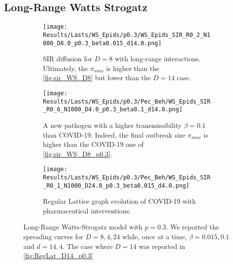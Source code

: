 \documentclass[a4paper,10pt]{book} %
\theoremstyle{definition}
\begin{document}
\clearpage
\subsection{Long-Range Watts Strogatz}
\begin{figure}[htbp]
    \centering
	\begin{subfigure}[t]{\textwidth}
        \centering
        \texttt{[image: Results/Lasts/WS\_Epids/p0.3/WS\_Epids\_SIR\_R0\_2\_N1000\_D8.0\_p0.3\_beta0.015\_d14.0.png]} 
        \caption{SIR diffusion for $ D = 8$ with long-range interactions. Ultimately, the $ \pi_{max} $ is higher than the \autoref{fig:sir_WS_D8} but lower than the $ D = 14$ case.} 
		\label{fig:sir_WS_D8_p0.3}
    \end{subfigure}
	\vfill
	\begin{subfigure}[t]{\textwidth}
        \centering
        \texttt{[image: Results/Lasts/WS\_Epids/p0.3/Pec\_Beh/WS\_Epids\_SIR\_R0\_6\_N1000\_D4.0\_p0.3\_beta0.1\_d14.0.png]}
        \caption{A new pathogen with a higher transmissibility $ \beta = 0.1$ than COVID-19. Indeed, the final outbreak size $\pi_{max} $ is higher than the COVID-19 one of \autoref{fig:sir_WS_D8_p0.3}.} 
		\label{fig:sir_WS_D4_b0.1_p0.3}
    \end{subfigure}
	\vfill
    \begin{subfigure}[t]{\textwidth}
        \centering
        \texttt{[image: Results/Lasts/WS\_Epids/p0.3/Pec\_Beh/WS\_Epids\_SIR\_R0\_1\_N1000\_D24.0\_p0.3\_beta0.015\_d4.0.png]} 
        \caption{Regular Lattice graph evolution of COVID-19 with pharmaceutical interventions.} 
		\label{fig:sir_WS_D24_d4_p0.3}
    \end{subfigure}
    \caption{Long-Range Watts-Strogatz model with $ p = 0.3$. We reported the spreading curves for $D = 8, 4, 24$ while, once at a time, $ \beta = 0.015, 0.1$ and $ d = 14,4$. The case where $ D = 14$ was reported in \autoref{fig:RegLat_D14_p0.3}}
	\label{fig:sir_WS_D5D5b0.1_D24d4_p0.3}
\end{figure}

\clearpage
{}
\end{document}
